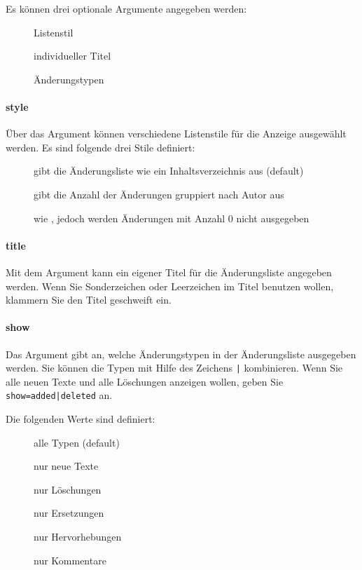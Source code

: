 Es können drei optionale Argumente angegeben werden:

\begin{description}
	\item[] Listenstil
	\item[] individueller Titel
	\item[] Änderungstypen
\end{description}

\paragraph{style}
Über das Argument  können verschiedene Listenstile für die Anzeige ausgewählt werden.
Es sind folgende drei Stile definiert:

\begin{description}
	\item[] gibt die Änderungsliste wie ein Inhaltsverzeichnis aus (default)
	\item[] gibt die Anzahl der Änderungen gruppiert nach Autor aus
	\item[] wie , jedoch werden Änderungen mit Anzahl 0 nicht ausgegeben
\end{description}

\paragraph{title}
Mit dem Argument  kann ein eigener Titel für die Änderungsliste angegeben werden.
Wenn Sie Sonderzeichen oder Leerzeichen im Titel benutzen wollen, klammern Sie den Titel geschweift ein.

\paragraph{show}
Das Argument  gibt an, welche Änderungstypen in der Änderungsliste ausgegeben werden.
Sie können die Typen mit Hilfe des Zeichens \texttt{|} kombinieren.
Wenn Sie \zB alle neuen Texte und alle Löschungen anzeigen wollen, geben Sie \texttt{show=added|deleted} an.

Die folgenden Werte sind definiert:

\begin{description}
	\item[] alle Typen (default)
	\item[] nur neue Texte
	\item[] nur Löschungen
	\item[] nur Ersetzungen
	\item[] nur Hervorhebungen
	\item[] nur Kommentare
\end{description}

